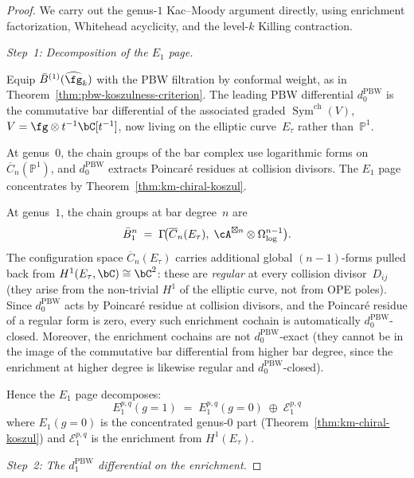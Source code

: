 \begin{proof}
We carry out the genus-$1$ Kac--Moody argument directly, using
enrichment factorization, Whitehead acyclicity, and the
level-$k$ Killing contraction.

\medskip
\emph{Step~1: Decomposition of the $E_1$ page.}

Equip $\bar{B}^{(1)}(\widehat{\fg}_k)$ with the PBW filtration
by conformal weight, as in
Theorem~\ref{thm:pbw-koszulness-criterion}.
The leading PBW differential $d_0^{\mathrm{PBW}}$ is the
commutative bar differential of the associated graded
$\operatorname{Sym}^{\mathrm{ch}}(V)$, $V = \fg \otimes
t^{-1}\bC[t^{-1}]$, now living on the
elliptic curve~$E_\tau$ rather than~$\mathbb{P}^1$.

At genus~$0$, the chain groups of the bar complex use
logarithmic forms on $\overline{C}_n(\mathbb{P}^1)$, and
$d_0^{\mathrm{PBW}}$ extracts Poincar\'{e} residues at
collision divisors.  The $E_1$ page concentrates
by Theorem~\ref{thm:km-chiral-koszul}.

At genus~$1$, the chain groups at bar degree~$n$ are
\[
\bar{B}^n_1 \;=\;
\Gamma\!\bigl(\overline{C}_n(E_\tau),\;
\cA^{\boxtimes n} \otimes \Omega^{n-1}_{\log}\bigr).
\]
The configuration space $\overline{C}_n(E_\tau)$ carries
additional global $(n{-}1)$-forms pulled back from
$H^1(E_\tau, \bC) \cong \bC^2$: these are
\emph{regular} at every collision divisor~$D_{ij}$
(they arise from the non-trivial $H^1$ of the elliptic curve,
not from OPE poles).  Since $d_0^{\mathrm{PBW}}$ acts by
Poincar\'{e} residue at collision divisors, and the
Poincar\'{e} residue of a regular form is zero, every
such enrichment cochain is automatically $d_0^{\mathrm{PBW}}$-closed.
Moreover, the enrichment cochains are not
$d_0^{\mathrm{PBW}}$-exact (they cannot be in the image
of the commutative bar differential from higher bar degree,
since the enrichment at higher degree is likewise
regular and $d_0^{\mathrm{PBW}}$-closed).

Hence the $E_1$ page decomposes:
\begin{equation}\label{eq:e1-decomposition-genus1}
E_1^{p,q}(g{=}1) \;=\; E_1^{p,q}(g{=}0)
  \;\oplus\; \mathcal{E}^{p,q}_1
\end{equation}
where $E_1(g{=}0)$ is the concentrated genus-$0$
part (Theorem~\ref{thm:km-chiral-koszul}) and
$\mathcal{E}^{p,q}_1$ is the enrichment from
$H^1(E_\tau)$.

\medskip
\emph{Step~2: The $d_1^{\mathrm{PBW}}$ differential on
the enrichment.}


\end{proof}
